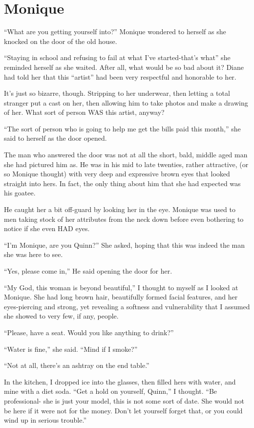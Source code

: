 \chapter{Monique}
``What are you getting yourself into?'' Monique wondered to herself as she knocked on the
door of the old house.

``Staying in school and refusing to fail at what I've started-that's what'' she reminded
herself as she waited. After all, what would be so bad about it? Diane had told her that this
``artist'' had been very respectful and honorable to her.

It's just so bizarre, though. Stripping to her underwear, then letting a total stranger put
a cast on her, then allowing him to take photos and make a drawing of her. What sort of person
WAS this artist, anyway?

``The sort of person who is going to help me get the bills paid this month,'' she said to
herself as the door opened.

The man who answered the door was not at all the short, bald, middle aged man she had
pictured him as. He was in his mid to late twenties, rather attractive, (or so Monique thought)
with very deep and expressive brown eyes that looked straight into hers. In fact, the only thing
about him that she had expected was his goatee.

He caught her a bit off-guard by looking her in the eye. Monique was used to men taking
stock of her attributes from the neck down before even bothering to notice if she even HAD eyes.

``I'm Monique, are you Quinn?'' She asked, hoping that this was indeed the man she was here
to see.

``Yes, please come in,'' He said opening the door for her.

``My God, this woman is beyond beautiful,'' I thought to myself as I looked at Monique. She
had long brown hair, beautifully formed facial features, and her eyes-piercing and strong, yet
revealing a softness and vulnerability that I assumed she showed to very few, if any, people.

``Please, have a seat. Would you like anything to drink?''

``Water is fine,'' she said. ``Mind if I smoke?''

``Not at all, there's an ashtray on the end table.''

In the kitchen, I dropped ice into the glasses, then filled hers with water, and mine with a
diet soda. ``Get a hold on yourself, Quinn,'' I thought. ``Be professional- she is just your
model, this is not some sort of date. She would not be here if it were not for the money. Don't
let yourself forget that, or you could wind up in serious trouble.''

